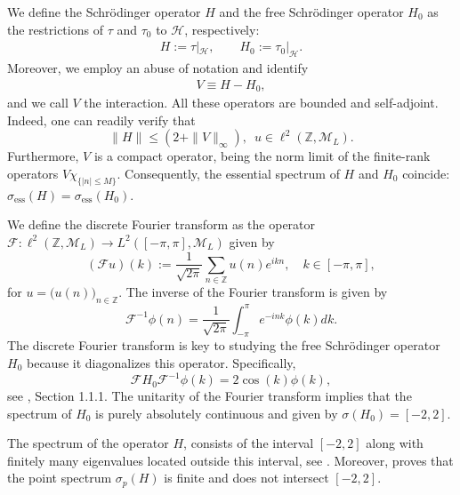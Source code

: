 \documentclass[12pt,oneside,onecolumn,open]{article}
\begin{document}
We define the Schr\"odinger operator $H$ and the free Schr\"odinger operator $H_0$ as the restrictions of $\tau$ and $\tau_0$ to $\mathcal{H}$, respectively:
\begin{align}
    H := \tau|_{ \mathcal{H} },    \qquad
    H_0 := \tau_0|_{ \mathcal{H} }.
\end{align}
Moreover, we employ an abuse of notation and identify
\begin{align}
    V \equiv  H-H_0,
\end{align}
and we call $V$ the interaction. All these operators are bounded and self-adjoint. Indeed, one can readily verify that
 \begin{equation}
        \|H\| \leq (2+\|V\|_{\infty }),\,\,\, u\in \ell ^{2}(\mathbb{Z}, \mathcal{M}_{L}). 
    \end{equation}
Furthermore, \(V\) is a compact operator, being the norm limit of the finite-rank operators \(V \chi_{\{|n| \leq M\}}\). Consequently, the essential spectrum of \(H\) and \(H_0\) coincide:
$ 
\sigma _{\text{ess}}(H) = \sigma _{\text{ess}}(H_{0}).
$ 


We define the discrete Fourier transform as the operator
$ 
\mathcal{F}: \ell^{2}(\mathbb{Z}, \mathcal{M}_{L}) \longrightarrow L^{2}([-\pi, \pi], \mathcal{M}_{L})
$ 
given by
\begin{equation}\label{Fourier}
(\mathcal{F}u)(k) := \frac{1}{\sqrt{2 \pi }} \sum_{n \in \mathbb{Z}} u(n)e^{ik n}, \quad k \in  [-\pi, \pi],
\end{equation} 
for $u = \big(u(n)\big)_{n \in \mathbb{Z}}$.
 The inverse of the Fourier transform is given by
\begin{equation}
    \mathcal{F}^{-1}\phi (n)= \frac{1}{\sqrt{2 \pi }}     \int _{-\pi }^{\pi }e^{-ink}\phi (k )dk .
\end{equation}
 The discrete Fourier transform is key to studying the free Schr\"odinger operator \(H_0\) because it diagonalizes this operator. Specifically,
\begin{equation} \label{Fourier transform}
     \mathcal{F} H_{0} \mathcal{F}^{-1} \phi (k) = 2\cos(k) \phi(k),
\end{equation}
see \cite{MR4385984}, Section 1.1.1. The unitarity of the Fourier transform implies that the spectrum of \(H_0\) is purely absolutely continuous and given by \(\sigma(H_{0}) = [-2,2]\).

The spectrum of the operator \(H\),  consists of the interval \([-2, 2]\) along with finitely many eigenvalues located outside this interval, see \cite{MR4760547}. Moreover, \cite{MR4760547} proves that the point spectrum \(\sigma_p(H)\) is finite and does not intersect \([-2,2]\).
\end{document}

